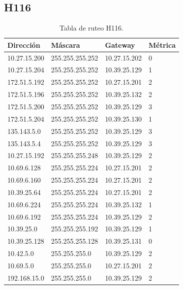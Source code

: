 \documentclass[12pt,titlepage]{article}
\begin{document}
\subsection{H116}
\begin{table}
  \begin{center}
    \begin{tabular}{|l|l|l|l|}
      \hline
        \bf{Direcci\'on} & \bf{M\'ascara} & \bf{Gateway} & \bf{M\'etrica} \\
      \hline 
	10.27.15.200  & 255.255.255.252 & 10.27.15.202 & 0 \\
        10.27.15.204  & 255.255.255.252 & 10.39.25.129 & 1 \\
        172.51.5.192  & 255.255.255.252 & 10.27.15.201 & 2 \\
        172.51.5.196  & 255.255.255.252 & 10.39.25.132 & 2 \\
        172.51.5.200  & 255.255.255.252 & 10.39.25.129 & 3 \\
        172.51.5.204  & 255.255.255.252 & 10.39.25.130 & 1 \\
        135.143.5.0   & 255.255.255.252 & 10.39.25.129 & 3 \\
        135.143.5.4   & 255.255.255.252 & 10.39.25.129 & 3 \\ 	
	10.27.15.192  & 255.255.255.248 & 10.39.25.129 & 2 \\
	10.69.6.128   & 255.255.255.224 & 10.27.15.201 & 2 \\
        10.69.6.160   & 255.255.255.224 & 10.27.15.201 & 2 \\
	10.39.25.64   & 255.255.255.224 & 10.27.15.201 & 2 \\       
	10.69.6.224   & 255.255.255.224 & 10.39.25.132 & 1 \\
	10.69.6.192   & 255.255.255.224 & 10.39.25.129 & 2 \\	
	10.39.25.0    & 255.255.255.192 & 10.39.25.129 & 1 \\
	10.39.25.128  & 255.255.255.128 & 10.39.25.131 & 0 \\
	10.42.5.0     & 255.255.255.0 & 10.39.25.129 & 2 \\
        10.69.5.0     & 255.255.255.0 & 10.27.15.201 & 2 \\
        192.168.15.0  & 255.255.255.0 & 10.39.25.129 & 2 \\  
    \hline
    \end{tabular} \\
  \end{center}
  \caption{Tabla de ruteo H116.}
\end{table}
\newpage
\end{document}
